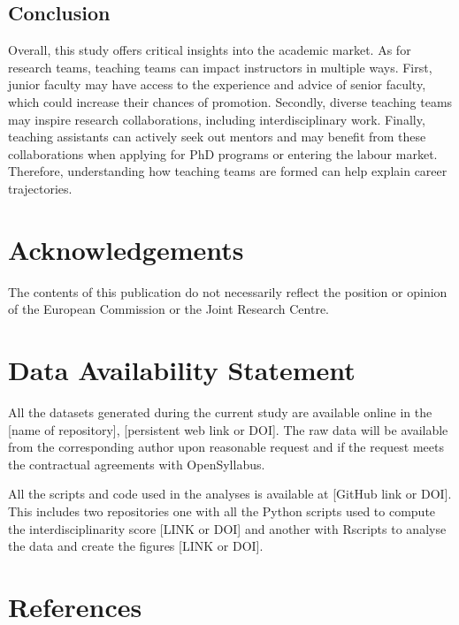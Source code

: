 \documentclass[
  11pt,
]{article}
\begin{document}
\subsection{Conclusion}\label{conclusion}

Overall, this study offers critical insights into the academic market. As for research teams, teaching teams can impact instructors in multiple ways. First, junior faculty may have access to the experience and advice of senior faculty, which could increase their chances of promotion. Secondly, diverse teaching teams may inspire research collaborations, including interdisciplinary work. Finally, teaching assistants can actively seek out mentors and may benefit from these collaborations when applying for PhD programs or entering the labour market. Therefore, understanding how teaching teams are formed can help explain career trajectories.

\clearpage
\processdelayedfloats
\clearpage

\section*{Acknowledgements}\label{acknowledgements}

The contents of this publication do not necessarily reflect the position or opinion of the European Commission or the Joint Research Centre.

\section*{Data Availability Statement}\label{data-availability-statement}

All the datasets generated during the current study are available online in the {[}name of repository{]}, {[}persistent web link or DOI{]}. The raw data will be available from the corresponding author upon reasonable request and if the request meets the contractual agreements with OpenSyllabus.

All the scripts and code used in the analyses is available at {[}GitHub link or DOI{]}. This includes two repositories one with all the Python scripts used to compute the interdisciplinarity score {[}LINK or DOI{]} and another with Rscripts to analyse the data and create the figures {[}LINK or DOI{]}.

\section*{References}\label{references}
\end{document}
